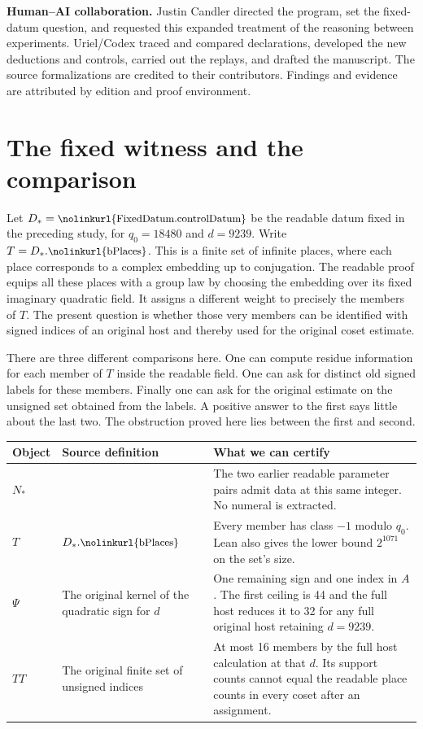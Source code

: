 \documentclass[12pt,letterpaper]{article}
\newcommand{\id}[1]{\ifmmode\text{\small\nolinkurl{#1}}\else{\small\nolinkurl{#1}}\fi}
\begin{document}
\medskip\textbf{Human--AI collaboration.} Justin Candler directed the program, set the fixed-datum question, and requested this expanded treatment of the reasoning between experiments. Uriel/Codex traced and compared declarations, developed the new deductions and controls, carried out the replays, and drafted the manuscript. The source formalizations are credited to their contributors. Findings and evidence are attributed by edition and proof environment.
\clearpage\begingroup\small\setlength{\parskip}{0pt}\tableofcontents\endgroup
\clearpage{}
\section{The fixed witness and the comparison}
Let $D_*=\id{FixedDatum.controlDatum}$ be the readable datum fixed in the preceding study, for $q_0=18480$ and $d=9239$. Write $T=D_*.\id{bPlaces}$. This is a finite set of infinite places, where each place corresponds to a complex embedding up to conjugation. The readable proof equips all these places with a group law by choosing the embedding over its fixed imaginary quadratic field. It assigns a different weight to precisely the members of $T$. The present question is whether those very members can be identified with signed indices of an original host and thereby used for the original coset estimate.

There are three different comparisons here. One can compute residue information for each member of $T$ inside the readable field. One can ask for distinct old signed labels for these members. Finally one can ask for the original estimate on the unsigned set obtained from the labels. A positive answer to the first says little about the last two. The obstruction proved here lies between the first and second.

\begin{center}\small
\begin{tabularx}{\linewidth}{@{}p{.23\linewidth}YY@{}}\toprule
Object & Source definition & What we can certify\\\midrule
$N_*$ & \id{FixedDatum.fixedN} & The two earlier readable parameter pairs admit data at this same integer. No numeral is extracted.\\
$T$ & $D_*.\id{bPlaces}$ & Every member has class $-1$ modulo $q_0$. Lean also gives the lower bound $2^{1071}$ on the set's size.\\
$\Psi$ & The original kernel of the quadratic sign for $d$ & One remaining sign and one index in $A$. The first ceiling is 44 and the full host reduces it to 32 for any full original host retaining $d=9239$.\\
$TT$ & The original finite set of unsigned indices & At most 16 members by the full host calculation at that $d$. Its support counts cannot equal the readable place counts in every coset after an assignment.\\\bottomrule
\end{tabularx}
\end{center}
\end{document}
